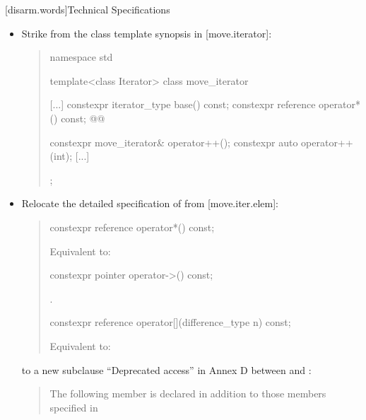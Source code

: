[disarm.words]{Technical Specifications}

\begin{itemize}
\item Strike  from the class template synopsis
  in [move.iterator]:
  \begin{quote}
  \begin{codeblock}
namespace std {
  template<class Iterator>
  class move_iterator {
    [...]
    constexpr iterator_type base() const;
    constexpr reference operator*() const;
    @@

    constexpr move_iterator& operator++();
    constexpr auto operator++(int);
    [...]
  };
}
  \end{codeblock}
  \end{quote}
\item Relocate the detailed specification of 
  from [move.iter.elem]:
  \begin{quote}
\begin{itemdecl}
constexpr reference operator*() const;
\end{itemdecl}
\setcounter{Paras}{0}
\begin{itemdescr}
\pnum \effects Equivalent to: 
\end{itemdescr}
\begin{removedblock}
\begin{itemdecl}
constexpr pointer operator->() const;
\end{itemdecl}
\begin{itemdescr}
\pnum \returns {}.
\end{itemdescr}
\end{removedblock}
\begin{itemdecl}
constexpr reference operator[](difference_type n) const;
\end{itemdecl}
\begin{itemdescr}
\pnum \effects Equivalent to: 
\end{itemdescr}
  \end{quote}
  to a new subclause ``Deprecated  access'' in Annex D
  between  and :
  \begin{quote}
  \begin{addedblock}
\setcounter{Paras}{0}
\pnum
The following member is declared in addition to those members specified in

\end{addedblock}
\end{quote}
\end{itemize}
